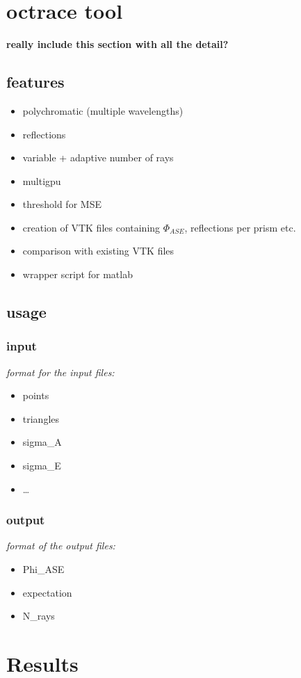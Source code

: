 \documentclass[a4paper,11pt]{article}
\begin{document}
\section{octrace tool}
\textbf{really include this section with all the detail?}
\subsection{features}
\begin{itemize}
  \item polychromatic (multiple wavelengths)
  \item reflections
  \item variable + adaptive number of rays
  \item multigpu
  \item threshold for MSE
  \item creation of VTK files containing $\Phi_{ASE}$, reflections per prism etc.
  \item comparison with existing VTK files 
  \item wrapper script for matlab
\end{itemize}

\subsection{usage}
\subsubsection{input}
\textit{format for the input files:}
\begin{itemize}
  \item points
  \item triangles
  \item sigma\_A
  \item sigma\_E
  \item \dots
\end{itemize}

\subsubsection{output}
\textit{format of the output files:}
\begin{itemize}
  \item Phi\_ASE
  \item expectation
  \item N\_rays
\end{itemize}


\section{Results}
\end{document}
